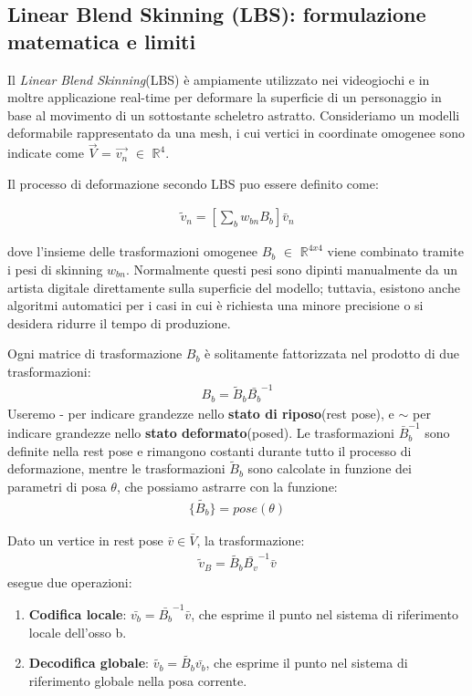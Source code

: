 \begin{itemize}
\subsection{Linear Blend Skinning (LBS): formulazione matematica e limiti}

Il \textit{Linear Blend Skinning}(LBS) è ampiamente utilizzato nei videogiochi e in moltre applicazione real-time per deformare la superficie di un personaggio in base al movimento di un sottostante scheletro astratto.
Consideriamo un modelli deformabile rappresentato da una mesh, i cui vertici in coordinate omogenee sono indicate come $\vec{V}$ = $\vec{v_n}$ $\in$ $\mathbb{R}^{4}$.

Il processo di deformazione secondo LBS puo essere definito come: 

\begin{align*}
    \tilde{v}_n = [\sum_b {w_{bn}}{B_b}]\bar{v}_n
\end{align*}

dove l'insieme delle trasformazioni omogenee \(B_b\) $\in$ $\mathbb{R}^{4x4}$ viene combinato tramite i pesi di skinning \(w_{bn}\).
Normalmente questi pesi sono dipinti manualmente da un artista digitale direttamente sulla superficie del modello; tuttavia, esistono anche algoritmi automatici per i casi in cui è richiesta una minore precisione o si desidera ridurre il tempo di produzione.

Ogni matrice di trasformazione \(B_b\) è solitamente fattorizzata nel prodotto di due trasformazioni:
\begin{align*}
    B_b = \tilde{B}_b\bar{{B}_b}^{-1}
\end{align*}
Useremo - per indicare grandezze nello \textbf{stato di riposo}(rest pose), e $\sim$ per indicare grandezze nello \textbf{stato deformato}(posed).
Le trasformazioni $\bar{B}_b^{-1}$ sono definite nella rest pose e rimangono costanti durante tutto il processo di deformazione, mentre le trasformazioni $\tilde{B}_b$ sono calcolate in funzione dei parametri di posa $\theta$, che possiamo astrarre con la funzione: 
\begin{align*}
    \{\tilde{B_b}\} = pose(\theta)
\end{align*}

Dato un vertice in rest pose $\bar{v} \in \bar{V}$, la trasformazione:
\begin{align*}
    \tilde{v}_B = \tilde{B_b}\bar{B_v}^{-1}\bar{v}
\end{align*}
esegue due operazioni:
\begin{enumerate}
    \item \textbf{Codifica locale}: $\bar{v_b}=\bar{B_b}^{-1}\bar{v}$, che esprime il punto nel sistema di riferimento locale dell'osso b.
    \item \textbf{Decodifica globale}: $\tilde{v_b}=\tilde{B_b}\bar{v_b}$, che esprime il punto nel sistema di riferimento globale nella posa corrente.
\end{enumerate}


\end{itemize}
